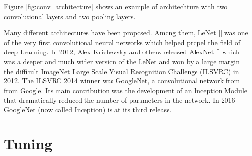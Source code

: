 Figure \ref{fig:conv_architecture} shows an example of architechture with two convolutional layers and two pooling layers.

Many different architectures have been proposed. Among them, LeNet [\cite{lecun-98}] was one of the very first convolutional neural networks which helped propel the field of deep Learning. In 2012, Alex Krizhevsky and others released AlexNet [\cite{krizhevsky2012imagenet}] which was a deeper and much wider version of the LeNet and won by a large margin the difficult \href{http://image-net.org/challenges/LSVRC/2012/index}{ImageNet Large Scale Visual Recognition Challenge (ILSVRC)} in 2012. The ILSVRC 2014 winner was GoogleNet, a convolutional network from [\cite{DBLP:journals/corr/SzegedyLJSRAEVR14}] from Google. Its main contribution was the development of an Inception Module that dramatically reduced the number of parameters in the network. In 2016 GoogleNet (now called Inception) is at its third release.

\section{Tuning}

